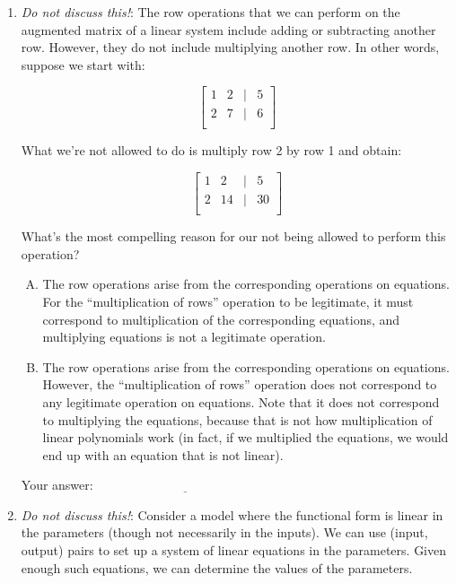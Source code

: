 \documentclass[10pt]{amsart}
\begin{document}
\begin{enumerate}
\item {\em Do not discuss this!}: The row operations that we can
  perform on the augmented matrix of a linear system include adding or
  subtracting another row. However, they do not include multiplying
  another row. In other words, suppose we start with:

  $$\left[\begin{matrix} 1 & 2 & | & 5\\ 2 & 7 & \mid & 6 \\\end{matrix}\right]$$

  What we're not allowed to do is multiply row 2 by row 1 and obtain:

  $$\left[\begin{matrix} 1 & 2 & | & 5\\ 2 & 14 & \mid & 30 \\\end{matrix}\right]$$

  What's the most compelling reason for our not being allowed to
  perform this operation?
  \begin{enumerate}[(A)]
  \item The row operations arise from the corresponding operations on
    equations. For the ``multiplication of rows'' operation to be
    legitimate, it must correspond to multiplication of the
    corresponding equations, and multiplying equations is not a
    legitimate operation.
  \item The row operations arise from the corresponding operations on
    equations. However, the ``multiplication of rows'' operation does
    not correspond to any legitimate operation on equations. Note that
    it does not correspond to multiplying the equations, because that
    is not how multiplication of linear polynomials work (in fact, if
    we multiplied the equations, we would end up with an equation that
    is not linear).
  \end{enumerate}

  \vspace{0.1in}
  Your answer: $\underline{\qquad\qquad\qquad\qquad\qquad\qquad\qquad}$
  \vspace{0.1in}

\item {\em Do not discuss this!}: Consider a model where the
  functional form is linear in the parameters (though not necessarily
  in the inputs). We can use (input, output) pairs to set up a system
  of linear equations in the parameters. Given enough such equations,
  we can determine the values of the parameters.


\end{enumerate}
\end{document}
